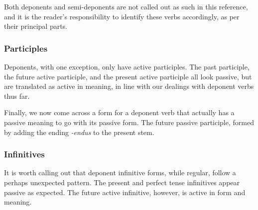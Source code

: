 Both deponents and semi-deponents are not called out as
such in this reference, and it is the reader's
responsibility to identify these verbs accordingly, as
per their principal parts.

\subsubsection{Participles}
Deponents, with one exception, only have active 
participles.  The past participle, the future active
participle, and the present active participle all look
passive, but are translated as active in meaning, in line
with our dealings with deponent verbs thus far.

%
%
%
%

Finally, we now come across a form for a deponent verb that
actually has a passive meaning to go with its passive form.
The future passive participle, formed by adding the ending
\emph{-endus} to the present stem.

%

\subsubsection{Infinitives}
It is worth calling out that deponent infinitive forms,
while regular, follow a perhaps unexpected pattern.  The
present and perfect tense infinitives appear passive as
expected.  The future active infinitive, however, is
active in form and meaning.



